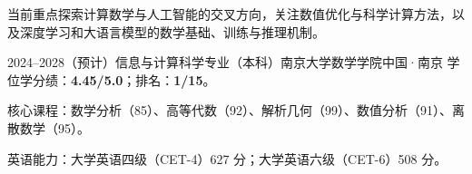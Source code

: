 \documentclass[11pt]{article}
\begin{document}
\makecvheader


当前重点探索计算数学与人工智能的交叉方向，关注数值优化与科学计算方法，以及深度学习和大语言模型的数学基础、训练与推理机制。


\begin{cventry}{2024--2028（预计）}{信息与计算科学专业（本科）}{南京大学数学学院}{中国·南京}
学位学分绩：\textbf{4.45/5.0}；排名：\textbf{1/15}。
\begin{cvitems}
  \item 核心课程：数学分析（85）、高等代数（92）、解析几何（99）、数值分析（91）、离散数学（95）。
  \item 英语能力：大学英语四级（CET-4）627 分；大学英语六级（CET-6）508 分。
\end{cvitems}
\end{cventry}






\end{document}
